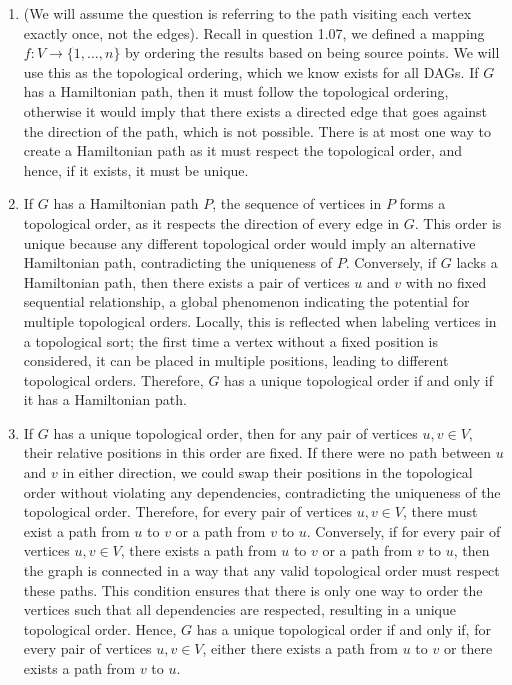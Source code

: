 \documentclass{article}
\begin{document}
\begin{solution}
\begin{enumerate}[label = (\alph*)]
    \item (We will assume the question is referring to the path visiting each \color{red}vertex \color{black} exactly once, not the edges). Recall in question 1.07, we defined a mapping $f: V \to \{1, \dots, n\}$ by ordering the results based on being source points. We will use this as the topological ordering, which we know exists for all DAGs. If $G$ has a Hamiltonian path, then it must follow the topological ordering, otherwise it would imply that there exists a directed edge that goes against the direction of the path, which is not possible. There is at most one way to create a Hamiltonian path as it must respect the topological order, and hence, if it exists, it must be unique.

    \item If $G$ has a Hamiltonian path $P$, the sequence of vertices in $P$ forms a topological order, as it respects the direction of every edge in $G$. This order is unique because any different topological order would imply an alternative Hamiltonian path, contradicting the uniqueness of $P$. Conversely, if $G$ lacks a Hamiltonian path, then there exists a pair of vertices $u$ and $v$ with no fixed sequential relationship, a global phenomenon indicating the potential for multiple topological orders. Locally, this is reflected when labeling vertices in a topological sort; the first time a vertex without a fixed position is considered, it can be placed in multiple positions, leading to different topological orders. Therefore, $G$ has a unique topological order if and only if it has a Hamiltonian path.

\item If $G$ has a unique topological order, then for any pair of vertices $u, v \in V$, their relative positions in this order are fixed. If there were no path between $u$ and $v$ in either direction, we could swap their positions in the topological order without violating any dependencies, contradicting the uniqueness of the topological order. Therefore, for every pair of vertices $u, v \in V$, there must exist a path from $u$ to $v$ or a path from $v$ to $u$. Conversely, if for every pair of vertices $u, v \in V$, there exists a path from $u$ to $v$ or a path from $v$ to $u$, then the graph is connected in a way that any valid topological order must respect these paths. This condition ensures that there is only one way to order the vertices such that all dependencies are respected, resulting in a unique topological order. Hence, $G$ has a unique topological order if and only if, for every pair of vertices $u, v \in V$, either there exists a path from $u$ to $v$ or there exists a path from $v$ to $u$.



\end{enumerate}
\end{solution}
\end{document}

